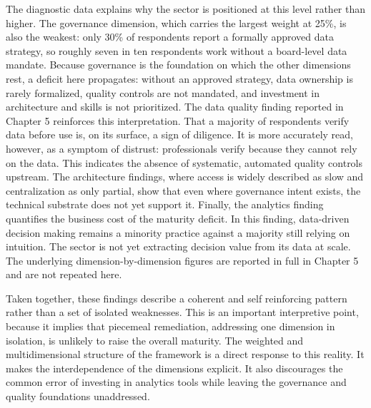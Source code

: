The diagnostic data explains why the sector is positioned at this level rather than higher. The governance dimension, which carries the largest weight at 25\%, is also the weakest: only 30\% of respondents report a formally approved data strategy, so roughly seven in ten respondents work without a board-level data mandate. Because governance is the foundation on which the other dimensions rest, a deficit here propagates: without an approved strategy, data ownership is rarely formalized, quality controls are not mandated, and investment in architecture and skills is not prioritized. The data quality finding reported in Chapter 5 reinforces this interpretation. That a majority of respondents verify data before use is, on its surface, a sign of diligence. It is more accurately read, however, as a symptom of distrust: professionals verify because they cannot rely on the data. This indicates the absence of systematic, automated quality controls upstream. The architecture findings, where access is widely described as slow and centralization as only partial, show that even where governance intent exists, the technical substrate does not yet support it. Finally, the analytics finding quantifies the business cost of the maturity deficit. In this finding, data-driven decision making remains a minority practice against a majority still relying on intuition. The sector is not yet extracting decision value from its data at scale. The underlying dimension-by-dimension figures are reported in full in Chapter 5 and are not repeated here.

Taken together, these findings describe a coherent and self reinforcing pattern rather than a set of isolated weaknesses. This is an important interpretive point, because it implies that piecemeal remediation, addressing one dimension in isolation, is unlikely to raise the overall maturity. The weighted and multidimensional structure of the framework is a direct response to this reality. It makes the interdependence of the dimensions explicit. It also discourages the common error of investing in analytics tools while leaving the governance and quality foundations unaddressed.

